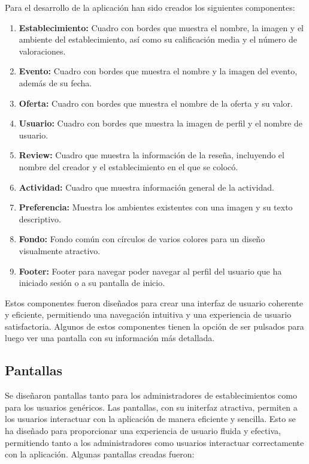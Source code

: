 Para el desarrollo de la aplicación han sido creados los siguientes componentes:

\begin{enumerate}
    \item \textbf{Establecimiento: } Cuadro con bordes que muestra el nombre, la imagen y el ambiente del establecimiento, así como su calificación media y el número de valoraciones.
    \item \textbf{Evento: } Cuadro con bordes que muestra el nombre y la imagen del evento, además de su fecha.
    \item \textbf{Oferta: } Cuadro con bordes que muestra el nombre de la oferta y su valor.
    \item \textbf{Usuario: } Cuadro con bordes que muestra la imagen de perfil y el nombre de usuario.
    \item \textbf{Review: } Cuadro que muestra la información de la reseña, incluyendo el nombre del creador y el establecimiento en el que se colocó.
    \item \textbf{Actividad: } Cuadro que muestra información general de la actividad.
    \item \textbf{Preferencia: } Muestra los ambientes existentes con una imagen y su texto descriptivo.
    \item \textbf{Fondo: } Fondo común con círculos de varios colores para un diseño visualmente atractivo.
    \item \textbf{Footer: } Footer para navegar poder navegar al perfil del usuario que ha iniciado sesión o a su pantalla de inicio.
\end{enumerate}

Estos componentes fueron diseñados para crear una interfaz de usuario coherente y eficiente, permitiendo una navegación intuitiva y una experiencia de usuario satisfactoria. Algunos de estos componentes tienen la opción de ser pulsados para luego ver una pantalla con su información más detallada.

\subsection{Pantallas}

Se diseñaron pantallas tanto para los administradores de establecimientos como para los usuarios genéricos. Las pantallas, con su initerfaz atractiva, permiten a los usuarios interactuar con la aplicación de manera eficiente y sencilla. Esto se ha diseñado para proporcionar una experiencia de usuario fluida y efectiva, permitiendo tanto a los administradores como usuarios interactuar correctamente con la aplicación. Algunas pantallas creadas fueron:

